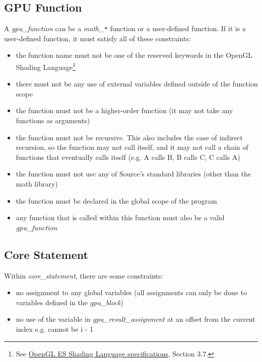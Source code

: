 \subsection*{GPU Function}

A \textit{gpu\_function} can be a \textit{math\_\texttt{*}} function or a user-defined function.
If it is a user-defined function, it must satisfy all of these constraints:

\begin{itemize}
    \item{the function name must not be one of the reserved keywords in the OpenGL Shading Language\footnote{See \href{ https://www.khronos.org/registry/OpenGL/specs/es/2.0/GLSL_ES_Specification_1.00.pdf}{OpenGL ES Shading Language specifications}, Section 3.7.}}
    \item{there must not be any use of external variables defined outside of the function scope}
    \item{the function must not be a higher-order function (it may not take any functions as arguments)}
    \item{the function must not be recursive. This also includes the case of indirect recursion, so the function may not call itself, and it may not call a chain of functions that eventually calls itself (e.g. A calls B, B calls C, C calls A)}
    \item{the function must not use any of Source's standard libraries (other than the math library)}
    \item{the function must be declared in the global scope of the program}
    \item{any function that is called within this function must also be a valid \textit{gpu\_function}}
\end{itemize}

\subsection*{Core Statement}

Within \textit{core\_statement}, there are some constraints:

\begin{itemize}
    \item{no assignment to any global variables (all assignments can only be done to variables defined in the \textit{gpu\_block}})
    \item{no use of the variable in \textit{gpu\_result\_assignment} at an offset from the current index e.g. cannot be i - 1}
\end{itemize}

